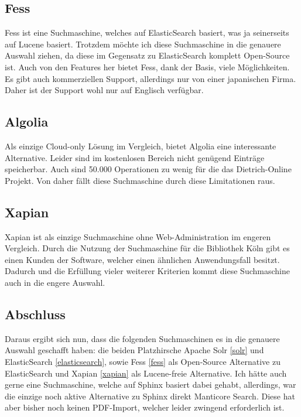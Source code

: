 \subsection{Fess}

Fess ist eine Suchmaschine, welches auf ElasticSearch basiert, was ja seinerseits auf Lucene basiert. Trotzdem möchte ich diese Suchmaschine in die genauere Auswahl ziehen, da diese im Gegensatz zu ElasticSearch komplett Open-Source ist. Auch von den Features her bietet Fess, dank der Basis, viele Möglichkeiten. Es gibt auch kommerziellen Support, allerdings nur von einer japanischen Firma. Daher ist der Support wohl nur auf Englisch verfügbar. \cite{CodeLibs.2019}

\subsection{Algolia}

Als einzige Cloud-only Lösung im Vergleich, bietet Algolia eine interessante Alternative. Leider sind im kostenlosen Bereich nicht genügend Einträge speicherbar. Auch sind 50.000 Operationen zu wenig für die das Dietrich-Online Projekt. Von daher fällt diese Suchmaschine durch diese Limitationen raus. \cite{Algolia.2019}

\subsection{Xapian}

Xapian ist als einzige Suchmaschine ohne Web-Administration im engeren Vergleich. Durch die Nutzung der Suchmaschine für die Bibliothek Köln gibt es einen Kunden der Software, welcher einen ähnlichen Anwendungsfall besitzt. \cite{Xapian.2019} Dadurch und die Erfüllung vieler weiterer Kriterien kommt diese Suchmaschine auch in die engere Auswahl. \cite{XAP.2019}

\subsection{Abschluss}

Daraus ergibt sich nun, dass die folgenden Suchmaschinen es in die genauere Auswahl geschafft haben: die beiden Platzhirsche Apache Solr \ref{solr} und ElasticSearch \ref{elasticsearch}, sowie Fess \ref{fess} als Open-Source Alternative zu ElasticSearch und Xapian \ref{xapian} als Lucene-freie Alternative. Ich hätte auch gerne eine Suchmaschine, welche auf Sphinx basiert dabei gehabt, allerdings, war die einzige noch aktive Alternative zu Sphinx direkt Manticore Search. Diese hat aber bisher noch keinen PDF-Import, welcher leider zwingend erforderlich ist. 


